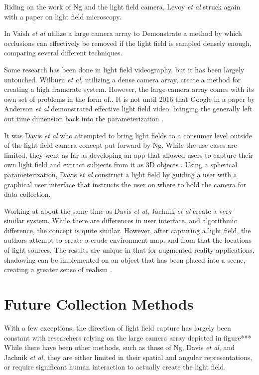 \documentclass[12pt]{report}
\begin{document}
Riding on the work of Ng and the light field camera, Levoy \emph{et al} struck again with a paper on light field microscopy.\cite{Levoy06b}

In \cite{Vaish06} Vaish \emph{et al} utilize a large camera array to Demonstrate a method by which occlusions can effectively be removed if the light field is sampled densely enough, comparing several different techniques.

Some research has been done in light field videography, but it has been largely untouched. Wilburn \emph{et al}, utilizing a dense camera array, create a method for creating a high framerate system. However, the large camera array comes with its own set of problems in the form of.. It is not until 2016 that Google in a paper by Anderson \emph{et al} demonstrated effective light field video, bringing the generally left out time dimension back into the parameterization \cite{Anderson16}. 

It was Davis \emph{et al} who attempted to bring light fields to a consumer level outside of the light field camera concept put forward by Ng. While the use cases are limited, they went as far as developing an app that allowed users to capture their own light field and extract subjects from it as 3D objects \cite{Davis12}. Using a spherical parameterization, Davis \emph{et al} construct a light field by guiding a user with a graphical user interface that instructs the user on where to hold the camera for data collection.

Working at about the same time as Davis \emph{et al}, Jachnik \emph{et al} create a very similar system. While there are differences in user interface, and algorithmic difference, the concept is quite similar. However, after capturing a light field, the authors attempt to create a crude environment map, and from that the locations of light sources. The results are unique in that for augmented reality applications, shadowing can be implemented on an object that has been placed into a scene, creating a greater sense of realism \cite{Jachnik13}.

\section{Future Collection Methods}
With a few exceptions, the direction of light field capture has largely been constant with researchers relying on the large camera array depicted in figure*** While there have been other methods, such as those of Ng, Davis \emph{et al}, and Jachnik \emph{et al}, they are either limited in their spatial and angular representations, or require significant human interaction to actually create the light field.
\end{document}
